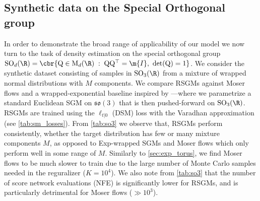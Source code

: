 \subsection{Synthetic data on the Special Orthogonal group}
\label{sec:exp_so3}
In order to demonstrate the broad range of applicability of our model we now turn to the task of density estimation on the special orthogonal group $\mathrm{SO}_d(\R) = \cbr{\mathrm{Q} \in \mathrm{M}_d(\R) \;:\;\mathrm{Q} \mathrm{Q}^\top = \m{I}, \ \det(\mathrm{Q})=1}$.
We consider the synthetic dataset consisting of samples in $\mathrm{SO}_3(\R)$ from a mixture of wrapped normal distributions with $M$ components.
We compare RSGMs against Moser flows and a wrapped-exponential baseline inspired by \textcite{falorsi2019reparameterizing}---where we parametrize a standard Euclidean SGM on $\mathfrak{so}(3)$ that is then pushed-forward on $\mathrm{SO}_3(\R)$.
RSGMs are trained using the $\ell_{t|0}$ (DSM) loss with the Varadhan approximation (see \cref{tab:sm_losses}).
From \cref{tab:so3} we observe that, RSGMs perform consistently, whether the target distribution has few or many mixture components $M$, as opposed to Exp-wrapped SGMs and Moser flows which only perform well in some range of $M$.
Similarly to \cref{sec:exp_torus}, we find Moser flows to be much slower to train due to the large number of Monte Carlo samples needed in the reguralizer ($K=10^4$).
We also note from \cref{tab:so3} that the number of score network evaluations (NFE) is significantly lower for RSGMs, and is particularly detrimental for Moser flows ($\gg 10^3$).

